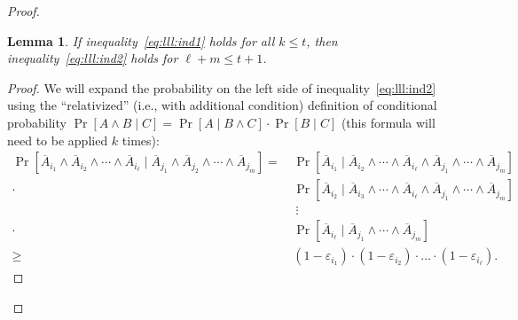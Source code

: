 \documentclass[12pt,sans]{article}
\theoremstyle{definition}
\theoremstyle{plain}
\newtheorem{lemma}{Lemma}[section]
\theoremstyle{remark}
\begin{document}
\begin{proof}
    \begin{lemma}\label{lm:lll:l1}
        If inequality~\eqref{eq:lll:ind1} holds for all $k \le t$, then inequality~\eqref{eq:lll:ind2} holds for $\ell + m \le t + 1$.
    \end{lemma}
    \begin{proof}
        We will expand the probability on the left side of inequality~\eqref{eq:lll:ind2}
        using the “relativized” (i.e., with additional condition) definition of conditional probability $\Pr[A \land B \mid C] = \Pr[A \mid B \land C] \cdot \Pr[B \mid C]$
        (this formula will need to be applied $k$ times):
        \[
        \begin{aligned}
            \Pr[\overline A_{i_1} \land \overline A_{i_2} \land \dotsb \land \overline A_{i_\ell} \mid
            \overline A_{j_1} \land \overline A_{j_2} \land \dotsb \land \overline A_{j_m}] =\,
            &\Pr[\overline A_{i_1} \mid \overline A_{i_2} \land \dotsb \land \overline A_{i_\ell} \land
            \overline A_{j_1} \land \dotsb \land \overline A_{j_m}]\\
            \cdot&\Pr[\overline A_{i_2} \mid \overline A_{i_3} \land \dotsb \land \overline A_{i_\ell} \land
            \overline A_{j_1} \land \dotsb \land \overline A_{j_m}]\\
            &\ \vdots\\
            \cdot&\Pr[\overline A_{i_\ell} \mid
            \overline A_{j_1} \land \dotsb \land \overline A_{j_m}]\\
            \ge\,&(1 - \varepsilon_{i_1}) \cdot (1 - \varepsilon_{i_2}) \cdot \dotso \cdot (1 - \varepsilon_{i_\ell}).
        \end{aligned}
        \]
    \end{proof}


\end{proof}
\end{document}
